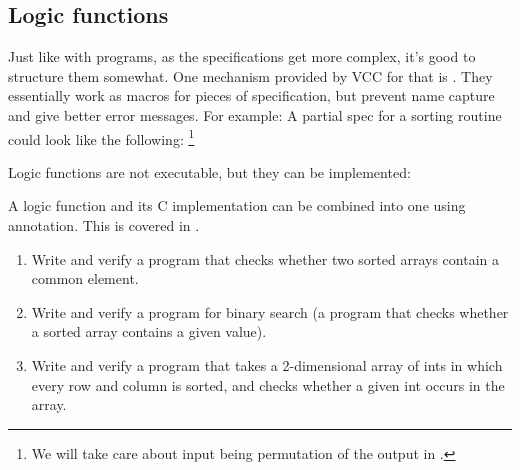 \subsection{Logic functions}
Just like with programs, as the specifications get more complex,
it's good to structure them somewhat.
One mechanism provided by VCC for that is .
They essentially work as macros for pieces of specification,
but prevent name capture and give better error messages.
For example:
\noindent
A partial spec for a sorting routine could look like the following:%
\footnote{We will take care about input being permutation of the output in .}

Logic functions are not executable, but they can be implemented:

A logic function and its C implementation can be combined into one using
 annotation.  This is covered in .
 
\begin{enumerate}

\item
Write and verify a program that checks whether two sorted arrays
contain a common element.
\item
Write and verify a program for binary search (a program
that checks whether a sorted array contains a given value).

\item 
Write and verify a program that takes a 2-dimensional array of ints in
which every row and column is sorted, and checks whether a given int
occurs in the array.
\end{enumerate}

